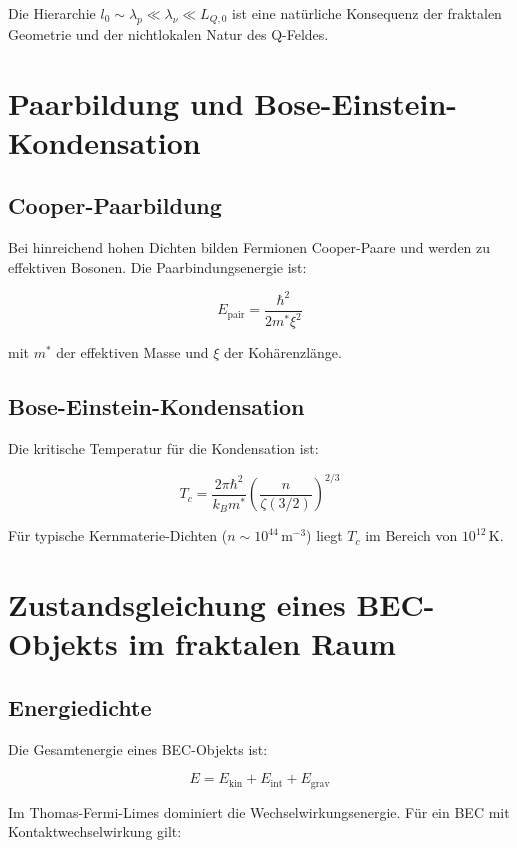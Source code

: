 Die Hierarchie \( l_0 \sim \lambda_p \ll \lambda_\nu \ll L_{Q,0} \) ist eine natürliche Konsequenz der fraktalen Geometrie und der nichtlokalen Natur des Q-Feldes.

\section{Paarbildung und Bose-Einstein-Kondensation}
\label{app:bec_paarbildung}

\subsection{Cooper-Paarbildung}
\label{sub:bec_cooper}

Bei hinreichend hohen Dichten bilden Fermionen Cooper-Paare und werden zu effektiven Bosonen. Die Paarbindungsenergie ist:

\[
E_{\text{pair}} = \frac{\hbar^2}{2m^* \xi^2} \tag{K.5}
\]

mit \( m^* \) der effektiven Masse und \( \xi \) der Kohärenzlänge.

\subsection{Bose-Einstein-Kondensation}
\label{sub:bec_kondensation}

Die kritische Temperatur für die Kondensation ist:

\[
T_c = \frac{2\pi \hbar^2}{k_B m^*} \left( \frac{n}{\zeta(3/2)} \right)^{2/3} \tag{K.6}
\]

Für typische Kernmaterie-Dichten (\( n \sim 10^{44} \, \text{m}^{-3} \)) liegt \( T_c \) im Bereich von \( 10^{12} \, \text{K} \).

\section{Zustandsgleichung eines BEC-Objekts im fraktalen Raum}
\label{app:bec_zustandsgleichung}

\subsection{Energiedichte}
\label{sub:bec_energie}

Die Gesamtenergie eines BEC-Objekts ist:

\[
E = E_{\text{kin}} + E_{\text{int}} + E_{\text{grav}} \tag{K.7}
\]

Im Thomas-Fermi-Limes dominiert die Wechselwirkungsenergie. Für ein BEC mit Kontaktwechselwirkung gilt:

